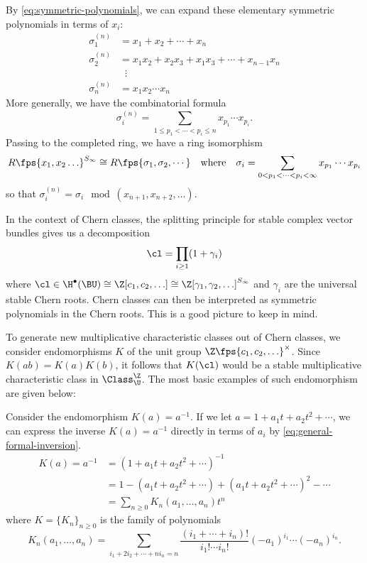 By \cref{eq:symmetric-polynomials}, we can expand these elementary symmetric polynomials in terms of $x_i$:
\[
	\begin{aligned}
		\sigma_1^{(n)} & = x_1+x_2+\cdots + x_n                          \\
		\sigma_2^{(n)} & = x_1x_2 + x_2x_3 + x_1x_3 +\cdots + x_{n-1}x_n \\
		               & \;\;\vdots                                      \\
		\sigma_n^{(n)} & = x_1x_2\cdots x_n
	\end{aligned}
\]
More generally, we have the combinatorial formula
\[
	\sigma_i^{(n)} = \sum_{1\leq p_1<\cdots <p_i\leq n} x_{p_1}\cdots x_{p_i}.
\]
Passing to the completed ring, we have a ring isomorphism
\[
	R\fps{x_1,x_2\ldots}^{S_\infty} \cong R\fps{\sigma_1,\sigma_2,\cdots}\quad\textrm{where}\quad \sigma_i = \sum_{0<p_1<\cdots < p_i<\infty}x_{p_1}\cdots x_{p_i}
\]
so that $\sigma_i^{(n)} = \sigma_i \mod (x_{n+1},x_{n+2},\ldots)$. 

\begin{remark}
In the context of Chern classes, the splitting principle for stable complex vector bundles gives us a decomposition
\[
	\cl = \prod_{i\geq 1}(1+\gamma_i)
\]
where $\cl\in \H^\bullet(\BU) \cong \Z[c_1,c_2,\ldots]\cong \Z[\gamma_1,\gamma_2,\ldots]^{S_\infty}$ and $\gamma_i$ are the universal stable Chern roots. Chern classes can then be interpreted as symmetric polynomials in the Chern roots. This is a good picture to keep in mind.
\end{remark}

To generate new multiplicative characteristic classes out of Chern classes, we consider endomorphisms $K$ of the unit group $\Z\fps{c_1,c_2,\ldots}^\times$. Since $K(ab)=K(a)K(b)$, it follows that $K(\cl)$ would be a stable multiplicative characteristic class in $\Class^\Z_{\U}$. The most basic examples of such endomorphism are given below:

\begin{example}
Consider the endomorphism $K(a)=a^{-1}$.
If we let $a=1+a_1t+a_2t^2+\cdots$, we can express the inverse $K(a)=a^{-1}$ directly in terms of $a_i$ by \cref{eq:general-formal-inversion}. 
\begin{equation}\label{eq:chern-inverse-non-symmetric}
	\begin{aligned}
		K(a)=a^{-1} & = (1+a_1t+a_2t^2+\cdots)^{-1}                              \\
		            & = 1-(a_1t+a_2t^2+\cdots) + (a_1t+a_2t^2+\cdots)^2 - \cdots \\
		            & = \sum_{n\geq 0} K_n(a_1,\ldots, a_n)t^n
	\end{aligned}
\end{equation}
where $K=\{K_n\}_{n\geq 0}$ is the family of polynomials
\begin{equation}\label{eq:inverse-K-series}
	K_n(a_1,\ldots, a_n) = \sum_{i_1+2i_2+\cdots+ ni_n=n}\frac{(i_1+\cdots+i_n)!}{i_1!\cdots i_n!}(-a_1)^{i_1}\cdots(-a_n)^{i_n}.
\end{equation}
\end{example}

